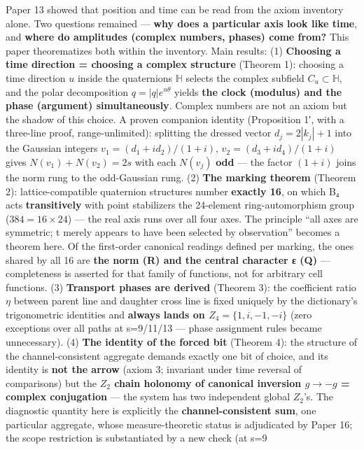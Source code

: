 \documentclass[
]{article}
\begin{document}
Paper 13 showed that position and time can be read from the axiom
inventory alone. Two questions remained --- \textbf{why does a
particular axis look like time}, and \textbf{where do amplitudes
(complex numbers, phases) come from?} This paper theorematizes both
within the inventory. Main results: (1) \textbf{Choosing a time
direction = choosing a complex structure} (Theorem 1): choosing a time
direction \(u\) inside the quaternions \(\mathbb{H}\) selects the
complex subfield \(C_u\subset\mathbb{H}\), and the polar decomposition
\(q=|q|e^{u\theta}\) yields \textbf{the clock (modulus) and the phase
(argument) simultaneously}. Complex numbers are not an axiom but the
shadow of this choice. A proven companion identity (Proposition 1′, with
a three-line proof, range-unlimited): splitting the dressed vector
\(d_j=2|k_j|+1\) into the Gaussian integers \(v_1=(d_1+id_2)/(1+i)\),
\(v_2=(d_3+id_4)/(1+i)\) gives \(N(v_1)+N(v_2)=2s\) with each \(N(v_j)\)
\textbf{odd} --- the factor \((1+i)\) joins the norm rung to the
odd-Gaussian rung. (2) \textbf{The marking theorem} (Theorem 2):
lattice-compatible quaternion structures number \textbf{exactly 16}, on
which B₄ acts \textbf{transitively} with point stabilizers the
24-element ring-automorphism group (\(384=16\times24\)) --- the real
axis runs over all four axes. The principle ``all axes are symmetric; t
merely appears to have been selected by observation'' becomes a theorem
here. Of the first-order canonical readings defined per marking, the
ones shared by all 16 are \textbf{the norm (R) and the central character
ε (Q)} --- completeness is asserted for that family of functions, not
for arbitrary cell functions. (3) \textbf{Transport phases are derived}
(Theorem 3): the coefficient ratio \(\eta\) between parent line and
daughter cross line is fixed uniquely by the dictionary's trigonometric
identities and \textbf{always lands on \(Z_4=\{1,i,-1,-i\}\)} (zero
exceptions over all paths at s=9/11/13 --- phase assignment rules became
unnecessary). (4) \textbf{The identity of the forced bit} (Theorem 4):
the structure of the channel-consistent aggregate demands exactly one
bit of choice, and its identity is \textbf{not the arrow} (axiom 3;
invariant under time reversal of comparisons) but the \textbf{\(Z_2\)
chain holonomy of canonical inversion \(g\to-g\) = complex conjugation}
--- the system has two independent global \(Z_2\)'s. The diagnostic
quantity here is explicitly the \textbf{channel-consistent sum}, one
particular aggregate, whose measure-theoretic status is adjudicated by
Paper 16; the scope restriction is substantiated by a new check (at s=9
\end{document}
